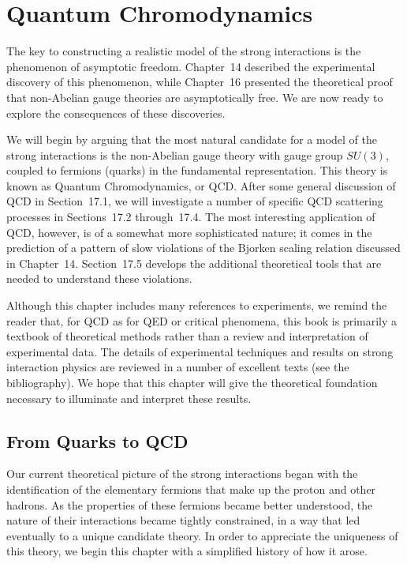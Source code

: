 \chapter{Quantum Chromodynamics}

The key to constructing a realistic model of the strong interactions is the
phenomenon of asymptotic freedom.  Chapter~14 described the experimental
discovery of this phenomenon, while Chapter~16 presented the theoretical
proof that non-Abelian gauge theories are asymptotically free.  We are now
ready to explore the consequences of these discoveries.

We will begin by arguing that the most natural candidate for a model of the
strong interactions is the non-Abelian gauge theory with gauge group $SU(3)$,
coupled to fermions (quarks) in the fundamental representation.  This theory
is known as Quantum Chromodynamics, or QCD.  After some general discussion
of QCD in Section~17.1, we will investigate a number of specific QCD
scattering processes in Sections~17.2 through~17.4.  The most interesting
application of QCD, however, is of a somewhat more sophisticated nature; it
comes in the prediction of a pattern of slow violations of the Bjorken scaling
relation discussed in Chapter~14.  Section~17.5 develops the additional
theoretical tools that are needed to understand these violations.

Although this chapter includes many references to experiments, we remind the
reader that, for QCD as for QED or critical phenomena, this book is primarily
a textbook of theoretical methods rather than a review and interpretation of
experimental data.  The details of experimental techniques and results on
strong interaction physics are reviewed in a number of excellent texts (see
the bibliography).  We hope that this chapter will give the theoretical
foundation necessary to illuminate and interpret these results.

\section{From Quarks to QCD}

Our current theoretical picture of the strong interactions began with the
identification of the elementary fermions that make up the proton and other
hadrons.  As the properties of these fermions became better understood, the
nature of their interactions became tightly constrained, in a way that led
eventually to a unique candidate theory.  In order to appreciate the
uniqueness of this theory, we begin this chapter with a simplified history of
how it arose.

